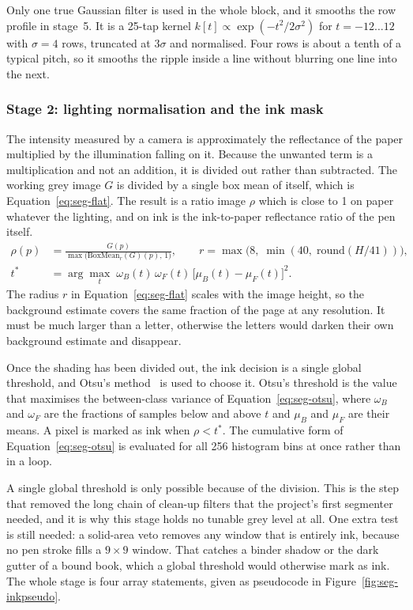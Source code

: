Only one true Gaussian filter is used in the whole block, and it smooths the row profile in stage~5. It is a 25-tap kernel $k[t]\propto\exp(-t^2/2\sigma^2)$ for $t=-12\ldots12$ with $\sigma=4$ rows, truncated at $3\sigma$ and normalised. Four rows is about a tenth of a typical pitch, so it smooths the ripple inside a line without blurring one line into the next.

\subsubsection{Stage 2: lighting normalisation and the ink mask}

The intensity measured by a camera is approximately the reflectance of the paper multiplied by the illumination falling on it. Because the unwanted term is a multiplication and not an addition, it is divided out rather than subtracted. The working grey image $G$ is divided by a single box mean of itself, which is Equation~\ref{eq:seg-flat}. The result is a ratio image $\rho$ which is close to 1 on paper whatever the lighting, and on ink is the ink-to-paper reflectance ratio of the pen itself.
\begin{align}
\rho(p)&=\frac{G(p)}{\max\bigl(\mathrm{BoxMean}_r(G)(p),\,1\bigr)},\qquad r=\max\bigl(8,\;\min(40,\;\mathrm{round}(H/41))\bigr),\label{eq:seg-flat}\\
t^*&=\arg\max_t\;\omega_B(t)\,\omega_F(t)\,\bigl[\mu_B(t)-\mu_F(t)\bigr]^2 .\label{eq:seg-otsu}
\end{align}
The radius $r$ in Equation~\ref{eq:seg-flat} scales with the image height, so the background estimate covers the same fraction of the page at any resolution. It must be much larger than a letter, otherwise the letters would darken their own background estimate and disappear.

Once the shading has been divided out, the ink decision is a single global threshold, and Otsu's method~\cite{otsu1979} is used to choose it. Otsu's threshold is the value that maximises the between-class variance of Equation~\ref{eq:seg-otsu}, where $\omega_B$ and $\omega_F$ are the fractions of samples below and above $t$ and $\mu_B$ and $\mu_F$ are their means. A pixel is marked as ink when $\rho<t^*$. The cumulative form of Equation~\ref{eq:seg-otsu} is evaluated for all 256 histogram bins at once rather than in a loop.

A single global threshold is only possible because of the division. This is the step that removed the long chain of clean-up filters that the project's first segmenter needed, and it is why this stage holds no tunable grey level at all. One extra test is still needed: a solid-area veto removes any window that is entirely ink, because no pen stroke fills a $9\times9$ window. That catches a binder shadow or the dark gutter of a bound book, which a global threshold would otherwise mark as ink. The whole stage is four array statements, given as pseudocode in Figure~\ref{fig:seg-inkpseudo}.

